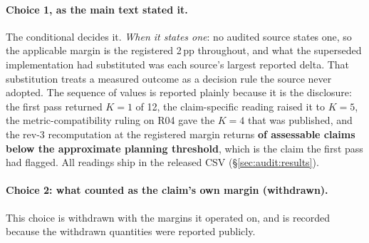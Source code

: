 \paragraph{Choice 1, as the main text stated it.}
%
The conditional decides it. \emph{When it states one}: no audited source states
one, so the applicable margin is the registered 2\,pp throughout, and what the
superseded implementation had substituted was each source's largest reported
delta. That substitution treats a measured outcome as a decision rule the source
never adopted. The sequence of values is reported plainly because it is the
disclosure: the first pass returned $K = 1$ of 12, the claim-specific reading
raised it to $K = 5$, the metric-compatibility ruling on R04 gave the $K = 4$
that was published, and the rev-3 recomputation at the registered margin returns
\textbf{\AuditBelowThresholdAtMedian{} of \AuditAssessable{} assessable claims
below the approximate planning threshold}, which is the claim the first pass had
flagged. All readings ship in the released CSV (\S\ref{sec:audit:results}).

\paragraph{Choice 2: what counted as the claim's own margin (withdrawn).}
%
This choice is withdrawn with the margins it operated on, and is recorded
because the withdrawn quantities were reported publicly.

